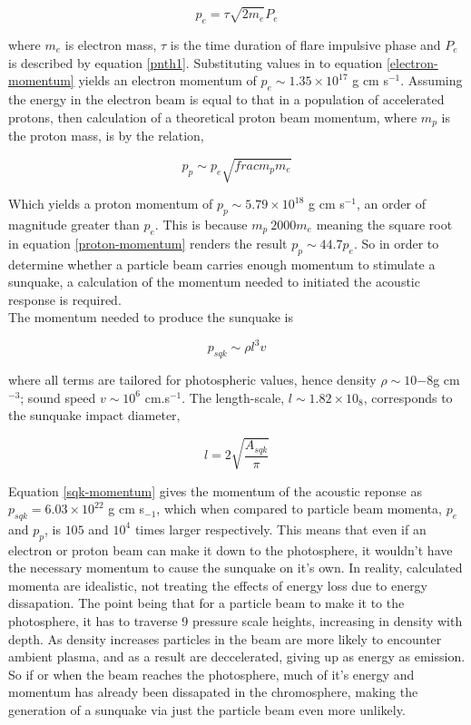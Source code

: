 \begin{equation}
p_e=\tau \sqrt{2m_e} P_{e}
\end{equation}\label{electron-momentum}

where $m_e$ is electron mass, $\tau$ is the time duration of flare impulsive phase and $P_{e}$ is described by equation \ref{pnth1}. Substituting values in to equation \ref{electron-momentum} yields an electron momentum of $p_e \sim 1.35{\times}10^{17}$ g cm s$^{-1}$. Assuming the energy in the electron beam is equal to that in a population of accelerated protons, then calculation of a theoretical proton beam momentum, where $m_p$ is the proton mass, is by the relation,

\begin{equation}
p_p \sim p_e \sqrt{frac{m_p}{m_e}}
\end{equation}\label{proton-momentum}

Which yields a proton momentum of $p_p \sim 5.79{\times}10^18$ g cm s$^{-1}$, an order of magnitude greater than $p_e$. This is because $m_p ~ 2000m_e$ meaning the square root in equation \ref{proton-momentum} renders the result $p_p \sim 44.7p_e$. So in order to determine whether a particle beam carries enough momentum to stimulate a sunquake, a calculation of the momentum needed to initiated the acoustic response is required.\\

The momentum needed to produce the sunquake is

\begin{equation}
p_{sqk}\sim \rho l^{3} v
\end{equation}\label{sqk-momentum} 

where all terms are tailored for photospheric values, hence density $\rho \sim 10{-8}$g cm$^{-3}$; sound speed $v \sim 10^{6}$ cm.s$^{-1}$. The length-scale, $l \sim  1.82{\times}10_{8}$, corresponds to the sunquake impact diameter, 

\begin{equation}
l = 2\sqrt{\frac{A_{sqk}}{\pi}}
\end{equation}\label{lengthscale}

Equation \ref{sqk-momentum} gives the momentum of the acoustic reponse as $p_{sqk} = 6.03{\times}10^{22}$ g cm s$_{-1}$, which when compared to particle beam momenta, $p_e$ and $p_p$, is $10{5}$ and $10^{4}$ times larger respectively. This means that even if an electron or proton beam can make it down to the photosphere, it wouldn't have the necessary momentum to cause the sunquake on it's own. In reality, calculated momenta are idealistic, not treating the effects of energy loss due to energy dissapation. The point being that for a particle beam to make it to the photosphere, it has to traverse 9 pressure scale heights, increasing in density with depth. As density increases particles in the beam are more likely to encounter ambient plasma, and as a result are deccelerated, giving up as energy as emission. So if or when the beam reaches the photosphere, much of it's energy and momentum has already been dissapated in the chromosphere, making the generation of a sunquake via just the particle beam even more unlikely.


